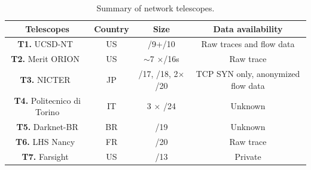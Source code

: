 \documentclass[manuscript,nonacm]{acmart}
\begin{document}
\begin{table}[httb]
	\small
	\caption{Summary of network telescopes.}\label{tab:telescopes}
	\begin{tabular}{cccc}
		\toprule
		Telescopes & Country & Size & Data availability\\
		\midrule
		\textbf{T1.} UCSD-NT~\cite{caida2025ucsdnt} & US & /9+/10 & Raw traces and flow data \\
		\textbf{T2.} Merit ORION~\cite{orion} & US & $\sim$7 $\times$/16s & Raw trace\\
		\textbf{T3.} NICTER~\cite{nicter2025nt} & JP &  /17, /18, 2$\times$/20 & TCP SYN only, anonymized flow data\\
		\textbf{T4.} Politecnico di Torino \cite{2020soro} & IT & 3 $\times$ /24 & Unknown\\
		\textbf{T5.} Darknet-BR \cite{CunhaCamargo2025darknetbr} & BR & /19 & Unknown\\
		\textbf{T6.} LHS Nancy~\cite{inria2025nt} & FR & /20 & Raw trace\\
		\textbf{T7.} Farsight~\cite{@@} & US & /13 & Private\\
		\bottomrule
	\end{tabular}
\end{table}
\end{document}
